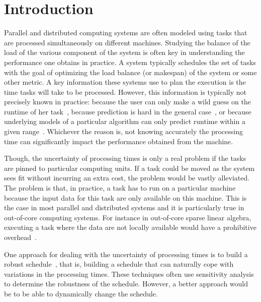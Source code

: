 \documentclass[twocolumn]{svjour3}
\begin{document}
\section{Introduction}

Parallel and distributed computing systems are often modeled using
tasks that are processed simultaneously on different
machines. Studying the balance of the load of the various component of
the system is often key in understanding the performance one obtains
in practice. A system typically schedules the set of tasks with the
goal of optimizing the load balance (or makespan) of the system or
some other metric. A key information these systems use to plan the
execution is the time tasks will take to be processed. However, this
information is typically not precisely known in practice: because the
user can only make a wild guess on the runtime of her
task~\cite{Luong2008}, because prediction is hard in the general
case~\cite{Wilhelm2008}, or because underlying models of a particular
algorithm can only predict runtime within a given
range~\cite{Erlebacher14-ICS}. Whichever the reason is, not knowing
accurately the processing time can significantly impact the
performance obtained from the machine.

Though, the uncertainty of processing times is only a real problem if
the tasks are pinned to particular computing units. If a task could
be moved as the system sees fit without incurring an extra cost, the
problem would be vastly alleviated. The problem is that, in practice,
a task has to run on a particular machine because the input data for
this task are only available on this machine. This is the case in most
parallel and distributed systems and it is particularly true in
out-of-core computing systems. For instance in out-of-core sparse
linear algebra, executing a task where the data are not locally
available would have a prohibitive
overhead~\cite{Zhou12-Cluster,Zhou12-P2S2}.

One approach for dealing with the uncertainty of processing times is
to build a robust
schedule~\cite{cj09c,Gatto07,Davenport_slack-basedtechniques}, that
is, building a schedule that can naturally cope with variations in the
processing times. These techniques often use sensitivity analysis to
determine the robustness of the schedule. However, a better approach
would be to be able to dynamically change the schedule.
\end{document}
